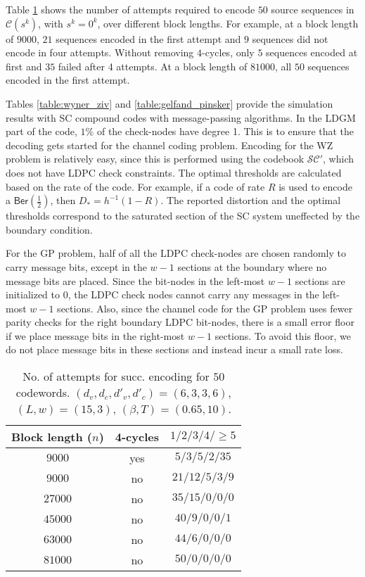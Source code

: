\label{section:numerical_results}
Table \ref{table:succ_enc} shows the number of attempts required to encode $50$ source sequences in $\mathcal{C}(s^k)$, with $s^k=0^k$, over different block lengths. 
For example, at a block length of $9000$, $21$ sequences encoded in the first attempt and $9$ sequences did not encode in four attempts.
Without removing $4$-cycles, only $5$ sequences encoded at first and $35$ failed after 4 attempts.
At a block length of $81000$, all $50$ sequences encoded in the first attempt.

Tables \ref{table:wyner_ziv} and \ref{table:gelfand_pinsker} provide the simulation results with SC compound codes with message-passing algorithms.
In the LDGM part of the code, $1\%$ of the check-nodes have degree 1.
This is to ensure that the decoding gets started for the channel coding problem.
Encoding for the WZ problem is relatively easy, since this is performed using the codebook $\mathcal{SC}'$, which does not have LDPC check constraints.
The optimal thresholds are calculated based on the rate of the code.
For example, if a code of rate $R$ is used to encode a $\mathsf{Ber}(\tfrac{1}{2})$, then $D_{*}=h^{-1}(1-R)$.
The reported distortion and the optimal thresholds correspond to the saturated section of the SC system uneffected by the boundary condition.

For the GP problem, half of all the LDPC check-nodes are chosen randomly to carry message bits, except in the $w-1$ sections at the boundary where no message bits are placed.
Since the bit-nodes in the left-most $w-1$ sections are initialized to $0$, the LDPC check nodes cannot carry any messages in the left-most $w-1$ sections.
Also, since the channel code for the GP problem uses fewer parity checks for the right boundary LDPC bit-nodes, there is a small error floor if we place message bits in the right-most $w-1$ sections.
To avoid this floor, we do not place message bits in these sections and instead incur a small rate loss.

\begin{table}[thb]
\begin{center}
\caption{No. of attempts for succ. encoding for $50$ codewords. 
  $(d_v,d_c,d'_v,d'_c)=(6,3,3,6)$, $(L,w)=(15,3)$, $(\beta,T)=(0.65,10)$.}
\label{table:succ_enc}
\vspace{-1mm}
\begin{tabular}{|c|c|c|}
\hline
Block length ($n$) & 4-cycles & $1/2/3/4/\geq 5$  \\
\hline
$9000$ & yes & $5/3/5/2/35$ \\
$9000$ & no & $21/12/5/3/9$ \\
$27000$ & no & $35/15/0/0/0$ \\
$45000$ & no & $40/9/0/0/1$ \\
$63000$ & no & $44/6/0/0/0$ \\
$81000$ & no & $50/0/0/0/0$\\ 
\hline  
\end{tabular}
\end{center}
\vspace{-0.65cm}
\end{table}

